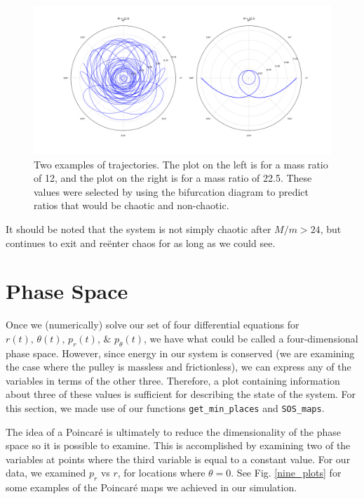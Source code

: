 \documentclass{article}
\begin{document}
\begin{figure}
\centering
\includegraphics[width=\textwidth]{two_spots}
\caption{Two examples of trajectories.  The plot on the left is for a mass ratio of 12, and the plot on the right is for a mass ratio of 22.5.  These values were selected by using the bifurcation diagram to predict ratios that would be chaotic and non-chaotic.}
\label{trajectories}
\end{figure}

It should be noted that the system is not simply chaotic after $M/m > 24$, but continues to exit and re\"enter chaos for as long as we could see.

\section*{Phase Space}

Once we (numerically) solve our set of four differential equations for $r(t),\, \theta(t),\, p_{r}(t),\,\& \,\, p_{\theta}(t)$, we have what could be called a four-dimensional phase space.  However, since energy in our system is conserved (we are examining the case where the pulley is massless and frictionless), we can express any of the variables in terms of the other three.  Therefore, a plot containing information about three of these values is sufficient for describing the state of the system.  For this section, we made use of our functions \texttt{get\_min\_places} and \texttt{SOS\_maps}.

The idea of a Poincar\'e is ultimately to reduce the dimensionality of the phase space so it is possible to examine.  This is accomplished by examining two of the variables at points where the third variable is equal to a constant value.  For our data, we examined $p_r$ vs $r$, for locations where $\theta = 0$.  See Fig. \ref{nine_plots} for some examples of the Poincar\'e maps we achieved in our simulation.  
\end{document}
